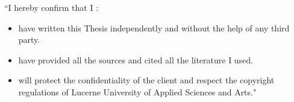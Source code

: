 ``I hereby confirm that I \underline{\hspace{10cm}}:
\begin{itemize}
    \item have written this Thesis independently and without the help of any third party.
    \item have provided all the sources and cited all the literature I used.
    \item will protect the confidentiality of the client and respect the copyright regulations of Lucerne University of Applied Sciences and Arts."
\end{itemize}